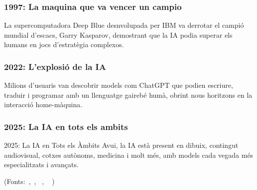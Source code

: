 \begin{enumerate}
        \subsubsection{1997: La maquina que va vencer un campio}
         La supercomputadora Deep Blue desnvolupada per IBM va derrotar el campió mundial d’escacs, Garry Kasparov, demostrant que la IA podia superar els humans en jocs d’estratègia complexos.
        \subsubsection{2022: L'explosió de la IA}
         Milions d’usuaris van descobrir models com ChatGPT que podien escriure, traduir i programar amb un llenguatge gairebé humà, obrint nous horitzons en la interacció home-màquina.
        \subsubsection{2025: La IA en tots els ambits}
        2025: La IA en Tots els Àmbits
        Avui, la IA està present en dibuix, contingut audiovisual, cotxes autònoms, medicina i molt més, amb models cada vegada més especialitzats i avançats.

\end{enumerate}

(Fonts:~\cite{McCarthy_Minsky_Rochester_Shannon_2006},~\cite{deep-blue},
~\cite{chatGPT-2022},
~\cite{10.1093/mind/LIX.236.433}
)
